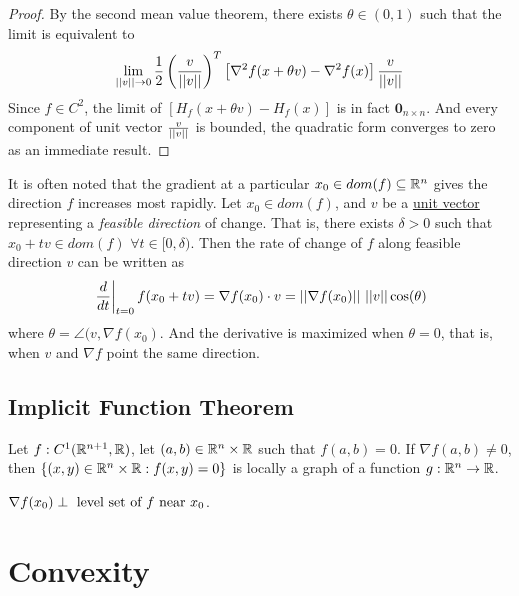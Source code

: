 \documentclass{article}
\begin{document}
    \begin{proof}
    	By the second mean value theorem, there exists $\theta \in (0, 1)$ such that the limit is equivalent to
    	\begin{align}
    		\lim_{\vert \vert {v} \vert \vert \to 0} \frac{1}{2} \left(\frac{v}{\vert \vert {v} \vert \vert}\right)^T \left[\nabla^2 f(x + \theta v) - \nabla^2 f(x)\right] \frac{v}{\vert \vert {v} \vert \vert}
    	\end{align}
    	Since $f \in C^2$, the limit of $\left[H_f(x + \theta v) - H_f(x)\right]$ is in fact $\textbf{0}_{n \times n}$. And every component of unit vector $\frac{v}{\vert \vert {v} \vert \vert}$ is bounded, the quadratic form converges to zero as an immediate result.
    \end{proof}
    \begin{remark}
    It is often noted that the gradient at a particular $x_0 \in dom(f) \subseteq \mathbb{R}^n$ gives the direction $f$ increases most rapidly.
        Let $x_0 \in dom(f)$, and $v$ be a \ul{unit vector} representing a \emph{feasible direction} of change. That is, there exists $\delta > 0$ such that $x_0 + t v \in dom(f)$ $\forall t \in [0, \delta)$. Then the rate of change of $f$ along feasible direction $v$ can be written as
        \begin{equation}
            \left.\frac{d}{dt}\right\vert_{t=0} f(x_0 + tv) = \nabla f(x_0) \cdot v = \vert \vert {\nabla f(x_0)} \vert \vert\ \vert \vert {v} \vert \vert \cos(\theta)
        \end{equation}
        where $\theta = \angle (v, \nabla f(x_0)$. And the derivative is maximized when $\theta=0$, that is, when $v$ and $\nabla f$ point the same direction.
    \end{remark}
    \subsection{Implicit Function Theorem}
    \begin{theorem}
        Let $f: C^1(\mathbb{R}^{n+1}, \mathbb{R})$, let $(a, b) \in \mathbb{R}^n \times \mathbb{R}$ such that $f(a, b) = 0$. If $\nabla f(a, b) \neq 0$, then $\{(x, y) \in \mathbb{R}^n \times \mathbb{R}:f(x, y) = 0\}$ is locally a graph of a function $g: \mathbb{R}^n \to \mathbb{R}$.
    \end{theorem}
    
    \begin{remark}
        $\nabla f(x_0) \perp \text{{ level set of $f$ near $x_0$}}$.
    \end{remark}
    
    \section{Convexity}
\end{document}
